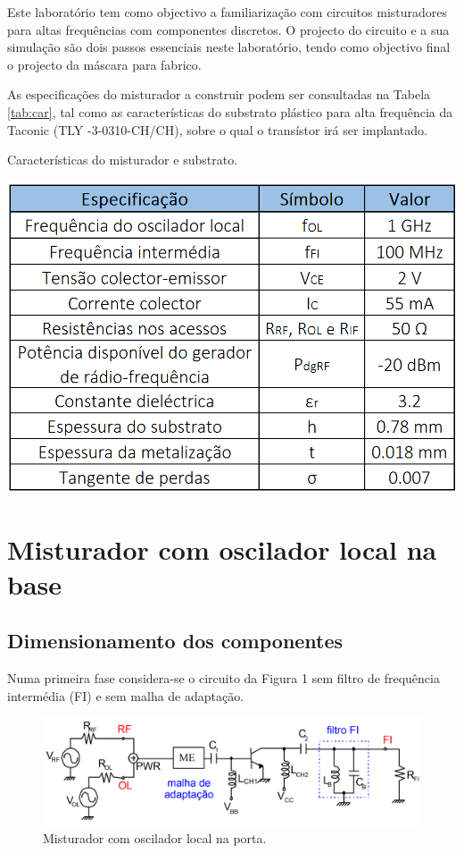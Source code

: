 \documentclass[11pt]{article}
\numberwithin{equation}{section}
\begin{document}
Este laboratório tem como objectivo a familiarização com circuitos misturadores para altas frequências com componentes discretos. O projecto do circuito e a sua simulação são dois passos essenciais neste laboratório, tendo como objectivo final o projecto da máscara para fabrico.

As especificações do misturador a construir podem ser consultadas na Tabela \ref{tab:car}, tal como as características do substrato plástico para alta frequência da Taconic (TLY -3-0310-CH/CH), sobre o qual o transístor irá ser implantado. 

\begin{table}[h]
\centering
\caption{Características do misturador e substrato.}
\vspace{-1.5mm}
\includegraphics[keepaspectratio=true, scale=0.35]{teoricas/table1}
\label{tab:car}
\end{table}

\section{Misturador com oscilador local na base}

\subsection{Dimensionamento dos componentes}

Numa primeira fase considera-se o circuito da Figura 1 sem filtro de frequência intermédia (FI) e sem malha de adaptação.

\begin{figure}[h]
\centering
\includegraphics[keepaspectratio=true, scale=0.30]{teoricas/circuitoOriginal}
\vspace{-0.5em}
\caption{Misturador com oscilador local na porta.}
\vspace{-0.8em}
\end{figure}
\end{document}

